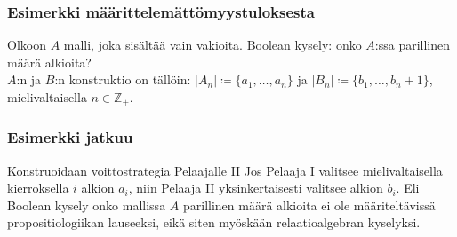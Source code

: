 \documentclass{beamer}
\begin{document}
\begin{frame}
\frametitle{Esimerkki määrittelemättömyystuloksesta}
Olkoon $A$ malli, joka sisältää vain vakioita. \pause Boolean kysely: onko $A$:ssa parillinen määrä alkioita? \pause \\ $A$:n ja $B$:n konstruktio on tällöin: $|A_n| \coloneqq \{a_1, \ldots, a_n\}$ ja $|B_n| \coloneqq \{b_1, \ldots, b_n+1\}$, mielivaltaisella $n \in \mathbb{Z}_+$.
\end{frame}

\begin{frame}
\frametitle{Esimerkki jatkuu}
Konstruoidaan voittostrategia Pelaajalle II \pause Jos Pelaaja I valitsee mielivaltaisella kierroksella $i$ alkion $a_i$, niin Pelaaja II yksinkertaisesti valitsee alkion $b_i$. \pause Eli Boolean kysely onko mallissa $A$ parillinen määrä alkioita ei ole määriteltävissä propositiologiikan lauseeksi, eikä siten myöskään relaatioalgebran kyselyksi.
\end{frame}
\end{document}
